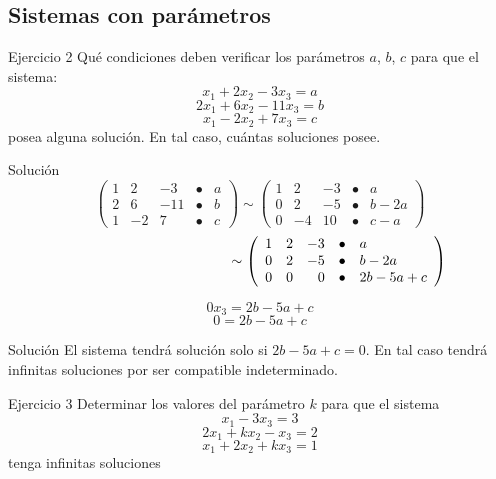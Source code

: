 \documentclass{beamer}
\begin{document}
\subsection{Sistemas con parámetros}
\begin{frame}
  {Ejercicio 2} Qué condiciones deben verificar los parámetros $a$, $b$, $c$ para que el sistema:
  $$x_1 +2x_2-3x_3=a$$
  $$2x_1 +6x_2-11x_3=b$$
  $$x_1 -2x_2+7x_3=c$$
  posea alguna solución. En tal caso, cuántas soluciones posee.

\end{frame}
\begin{frame}{Solución}
  $$\left(
    \begin{array}{rrrrl}
        1 & 2  & -3  & \bullet & a \\
        2 & 6  & -11 & \bullet & b \\
        1 & -2 & 7   & \bullet & c
      \end{array}
    \right) \sim \left(
    \begin{array}{rrrrl}
        1 & 2  & -3 & \bullet & a    \\
        0 & 2  & -5 & \bullet & b-2a \\
        0 & -4 & 10 & \bullet & c-a
      \end{array}
    \right)$$
  $$\hspace*{4cm}
    \sim \left(
    \begin{array}{rrrrl}
        1 & 2 & -3 & \bullet & a         \\
        0 & 2 & -5 & \bullet & b-2a      \\
        0 & 0 & 0  & \bullet & 2b -5a +c
      \end{array}
    \right)$$

  $$0x_3=2b -5a +c$$
  $$0=2b -5a +c$$
\end{frame}
\begin{frame}{Solución}
  El sistema tendrá solución solo si $2b -5a +c=0$. En tal caso tendrá
  infinitas soluciones por ser compatible indeterminado.
\end{frame}
\begin{frame}
  {Ejercicio 3} Determinar los valores del parámetro $k$ para que el sistema
  $$x_1 -3x_3=3$$
  $$2x_1 +kx_2-x_3=2$$
  $$x_1 +2x_2+kx_3=1$$
  tenga infinitas soluciones
\end{frame}
\end{document}
